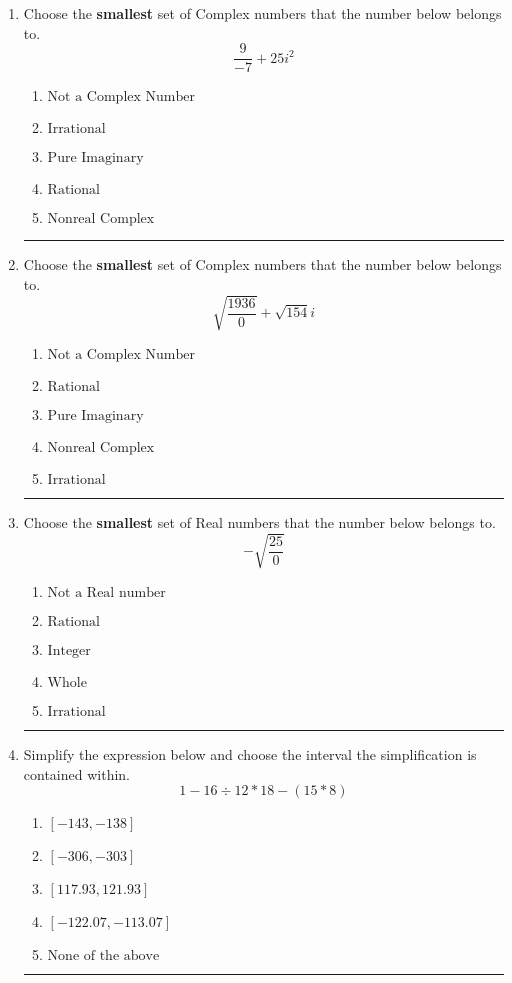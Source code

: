 \documentclass[14pt]{extbook}
\newcommand{\litem}[1]{\item#1\hspace*{-1cm}\rule{\textwidth}{0.4pt}}
\begin{document}
\begin{enumerate}
{\begin{enumerate}[label=\Alph*.]
\end{enumerate} }
\litem{
Choose the \textbf{smallest} set of Complex numbers that the number below belongs to.\[ \frac{9}{-7}+25i^2 \]\begin{enumerate}[label=\Alph*.]
\item \( \text{Not a Complex Number} \)
\item \( \text{Irrational} \)
\item \( \text{Pure Imaginary} \)
\item \( \text{Rational} \)
\item \( \text{Nonreal Complex} \)

\end{enumerate} }
\litem{
Choose the \textbf{smallest} set of Complex numbers that the number below belongs to.\[ \sqrt{\frac{1936}{0}}+\sqrt{154} i \]\begin{enumerate}[label=\Alph*.]
\item \( \text{Not a Complex Number} \)
\item \( \text{Rational} \)
\item \( \text{Pure Imaginary} \)
\item \( \text{Nonreal Complex} \)
\item \( \text{Irrational} \)

\end{enumerate} }
\litem{
Choose the \textbf{smallest} set of Real numbers that the number below belongs to.\[ -\sqrt{\frac{25}{0}} \]\begin{enumerate}[label=\Alph*.]
\item \( \text{Not a Real number} \)
\item \( \text{Rational} \)
\item \( \text{Integer} \)
\item \( \text{Whole} \)
\item \( \text{Irrational} \)

\end{enumerate} }
\litem{
Simplify the expression below and choose the interval the simplification is contained within.\[ 1 - 16 \div 12 * 18 - (15 * 8) \]\begin{enumerate}[label=\Alph*.]
\item \( [-143, -138] \)
\item \( [-306, -303] \)
\item \( [117.93, 121.93] \)
\item \( [-122.07, -113.07] \)
\item \( \text{None of the above} \)


\end{enumerate}}
\end{enumerate}
\end{document}
